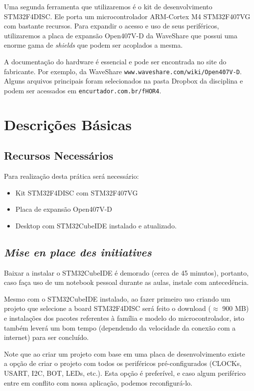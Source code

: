 \documentclass[12pt,journal,compsoc]{IEEEtran}
\begin{document}
Uma segunda ferramenta que utilizaremos é o kit de desenvolvimento STM32F4DISC. Ele porta um microcontrolador ARM-Cortex M4 STM32F407VG com bastante recursos. Para expandir o acesso e uso de seus periféricos, utilizaremos a placa de expansão Open407V-D da WaveShare que possui uma enorme gama de \emph{shields} que podem ser acoplados a mesma.

A documentação do hardware é essencial e pode ser encontrada no site do fabricante. Por exemplo, da WaveShare \texttt{www.waveshare.com/wiki/Open407V-D}. Alguns arquivos principais foram selecionados na pasta Dropbox da disciplina e podem ser acessados em \texttt{encurtador.com.br/fHOR4}.

\section{Descrições Básicas}

\subsection{Recursos Necessários}

Para realização desta prática será necessário:

\begin{itemize}
\item Kit STM32F4DISC com STM32F407VG
\item Placa de expansão Open407V-D
\item Desktop com STM32CubeIDE instalado e atualizado.
\end{itemize}

\subsection{\emph{Mise en place des initiatives}}

Baixar a instalar o STM32CubeIDE é demorado (cerca de 45 minutos), portanto, caso faça uso de um notebook pessoal durante as aulas, instale com antecedência. 

Mesmo com o STM32CubeIDE instalado, ao fazer primeiro uso criando um projeto que selecione a board STM32F4DISC será feito o download ($\approx$ 900 MB) e instalações dos pacotes referentes à família e modelo do microcontrolador, isto também leverá um bom tempo (dependendo da velocidade da conexão com a internet) para ser concluído.

Note que ao criar um projeto com base em uma placa de desenvolvimento existe a opção de criar o projeto com todos os periféricos pré-configurados (CLOCKs, USART, I2C, BOT, LEDs, etc.). Esta opção é preferível, e caso algum periférico entre em conflito com nossa aplicação, podemos reconfigurá-lo.
\end{document}
